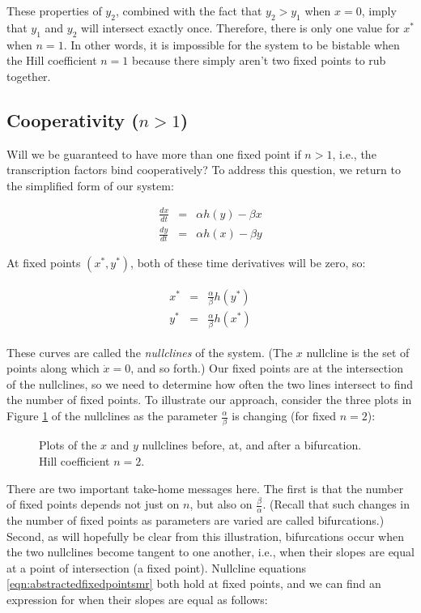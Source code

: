 \documentclass{article}
\begin{document}
These properties of $y_2$, combined with the fact that $y_2 > y_1$ when $x=0$, imply that $y_1$ and $y_2$ will intersect exactly once. Therefore, there is only one value for $x^*$ when $n=1$. In other words, it is impossible for the system to be bistable when the Hill coefficient $n=1$ because there simply aren't two fixed points to rub together.

\subsection*{Cooperativity ($n>1$)}

Will we be guaranteed to have more than one fixed point if $n>1$, i.e., the transcription factors bind cooperatively? To address this question, we return to the simplified form of our system:

\begin{eqnarray*}
\frac{dx}{dt} & =  & \alpha h(y)  -  \beta x\\
\frac{dy}{dt} & =  &  \alpha h(x) - \beta y
\end{eqnarray*}

At fixed points $(x^*, y^*)$, both of these time derivatives will be zero, so:

\begin{eqnarray}
\begin{aligned}
x^* & =  & \frac{\alpha}{\beta} h(y^*)\\
y^* & =  & \frac{\alpha}{\beta} h(x^*) \label{eqn:abstractedfixedpointsmr}
\end{aligned}
\end{eqnarray}

These curves are called the \textit{nullclines} of the system. (The $x$ nullcline is the set of points along which $\dot{x}=0$, and so forth.)  Our fixed points are at the intersection of the nullclines, so we need to determine how often the two lines intersect to find the number of fixed points. To illustrate our approach, consider the three plots in Figure \ref{fig:tangent} of the nullclines as the parameter $\frac{\alpha}{\beta}$ is changing (for fixed $n=2$):\\

\begin{figure}[htp] 
\caption{Plots of the $x$ and $y$ nullclines before, at, and after a bifurcation. Hill coefficient $n=2$.} \label{fig:tangent}
\end{figure}

There are two important take-home messages here. The first is that the number of fixed points depends not just on $n$, but also on $\frac{\beta}{\alpha}$. (Recall that such changes in the number of fixed points as parameters are varied are called bifurcations.) Second, as will hopefully be clear from this illustration, bifurcations occur when the two nullclines become tangent to one another, i.e., when their slopes are equal at a point of intersection (a fixed point). Nullcline equations \ref{eqn:abstractedfixedpointsmr} both hold at fixed points, and we can find an expression for when their slopes are equal as follows:
\end{document}

